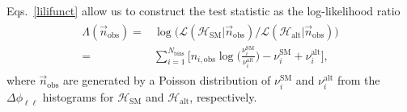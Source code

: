 \documentclass[preprint]{JHEP3}
\newcommand{\mrm}{\mathrm}
\newcommand{\SM}{\mathrm{SM}}
\newcommand{\alt}{\mathrm{alt}}
\def\HSM{\mathcal{H}_{\mathrm{SM}}}
\def\Halt{\mathcal{H}_{\mathrm{alt}}}
\newcommand{\be}{\begin{eqnarray}}
\newcommand{\ee}{\end{eqnarray}}
\begin{document}
Eqs.~\ref{lilifunct} allow us to construct the test statistic as the log-likelihood ratio
\be
\begin{split}
  \Lambda(\vec{n}_\mathrm{obs}) =& \log \biggl( \mathcal{L}(\HSM |\vec{n}_\mathrm{obs})  \big/ \mathcal{L}(\Halt|\vec{n}_\mathrm{obs})  \biggr)  \\
                                =& \sum_{i=1}^{N_\mathrm{bins}} \biggl[ n_{i,\mathrm{obs}}\log \biggl( \frac{\nu_i^{\SM}}{\nu_i^{\alt}} \biggr) -\nu_i^{\SM} + \nu_i^{\alt} \biggr],
\end{split}
\ee
where $\vec{n}_{\mrm{obs}}$ are generated by a Poisson distribution of $\nu_i^{\SM}$ and $\nu_i^{\alt}$
from the $\Delta \phi_{\ell\ell}$ histograms for $\HSM$ and $\Halt$, respectively.
\end{document}

